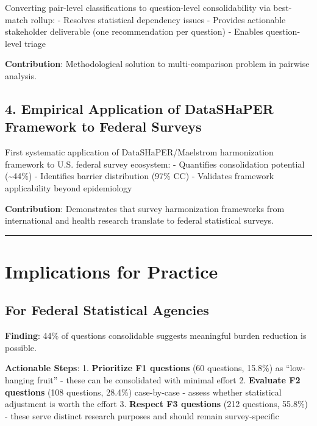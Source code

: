 \documentclass[
  letterpaper,
]{report}
\begin{document}
Converting pair-level classifications to question-level consolidability
via best-match rollup: - Resolves statistical dependency issues -
Provides actionable stakeholder deliverable (one recommendation per
question) - Enables question-level triage

\textbf{Contribution}: Methodological solution to multi-comparison
problem in pairwise analysis.

\subsection{4. Empirical Application of DataSHaPER Framework to Federal
Surveys}\label{empirical-application-of-datashaper-framework-to-federal-surveys}

First systematic application of DataSHaPER/Maelstrom harmonization
framework to U.S. federal survey ecosystem: - Quantifies consolidation
potential (\textasciitilde44\%) - Identifies barrier distribution (97\%
CC) - Validates framework applicability beyond epidemiology

\textbf{Contribution}: Demonstrates that survey harmonization frameworks
from international and health research translate to federal statistical
surveys.

\begin{center}\rule{0.5\linewidth}{0.5pt}\end{center}

\section{Implications for Practice}\label{implications-for-practice}

\subsection{For Federal Statistical
Agencies}\label{for-federal-statistical-agencies}

\textbf{Finding}: 44\% of questions consolidable suggests meaningful
burden reduction is possible.

\textbf{Actionable Steps}: 1. \textbf{Prioritize F1 questions} (60
questions, 15.8\%) as ``low-hanging fruit'' - these can be consolidated
with minimal effort 2. \textbf{Evaluate F2 questions} (108 questions,
28.4\%) case-by-case - assess whether statistical adjustment is worth
the effort 3. \textbf{Respect F3 questions} (212 questions, 55.8\%) -
these serve distinct research purposes and should remain survey-specific
\end{document}
